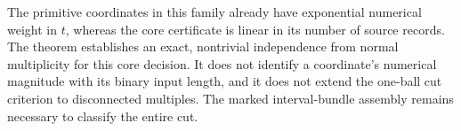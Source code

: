 The primitive coordinates in this family already have exponential
numerical weight in $t$, whereas the core certificate is linear in its
number of source records.  The theorem establishes an exact, nontrivial
independence from normal multiplicity for this core decision.  It does not
identify a coordinate's numerical magnitude with its binary input length,
and it does not extend the one-ball cut criterion to disconnected
multiples.  The marked interval-bundle assembly remains necessary to
classify the entire cut.
